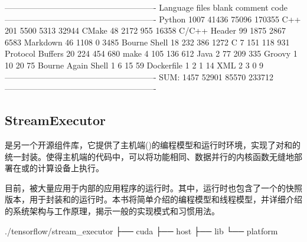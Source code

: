\begin{content}
\begin{leftbar}
\begin{python}[caption={Contrib代码统计}]
-------------------------------------------------------
Language            files     blank   comment      code
-------------------------------------------------------
Python               1007     41436     75096    170355
C++                   201      5500      5313     32944
CMake                  48      2172       955     16358
C/C++ Header           99      1875      2867      6583
Markdown               46      1108         0      3485
Bourne Shell           18       232       386      1272
C                       7       151       118       931
Protocol Buffers       20       224       454       680
make                    4       105       136       612
Java                    2        77       209       335
Groovy                  1        10        20        75
Bourne Again Shell      1         6        15        59
Dockerfile              1         2         1        14
XML                     2         3         0         9
-------------------------------------------------------
SUM:                 1457     52901     85570    233712
-------------------------------------------------------
\end{python}
\end{leftbar}

\subsection{StreamExecutor}

是另一个开源组件库，它提供了主机端()的编程模型和运行时环境，实现了对和的统一封装。使得主机端的代码中，可以将功能相同、数据并行的内核函数无缝地部署在或的计算设备上执行。

目前，被大量应用于内部的应用程序的运行时。其中，\tf{}运行时也包含了一个的快照版本，用于封装和的运行时。本书将简单介绍的编程模型和线程模型，并详细介绍的系统架构与工作原理，揭示一般的实现模式和习惯用法。

\begin{leftbar}
\begin{c++}[caption={StreamExecutor源码结构}]
./tensorflow/stream_executor
├── cuda
├── host
├── lib
└── platform
\end{c++}
\end{leftbar}


\end{content}
